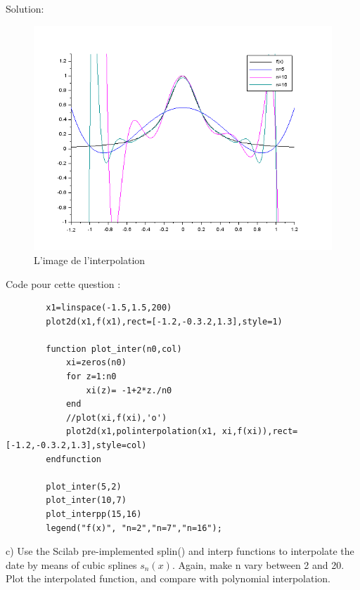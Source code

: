 \documentclass[11pt]{article}
\begin{document}
    Solution:
    \begin{figure}[H]
        \centering
        \includegraphics[scale=0.38]{inter}
        \caption{L'image de l'interpolation}
    \end{figure}
    Code pour cette question :
    \begin{verbatim}
        x1=linspace(-1.5,1.5,200)
        plot2d(x1,f(x1),rect=[-1.2,-0.3.2,1.3],style=1)

        function plot_inter(n0,col)
            xi=zeros(n0)
            for z=1:n0
                xi(z)= -1+2*z./n0
            end
            //plot(xi,f(xi),'o')
            plot2d(x1,polinterpolation(x1, xi,f(xi)),rect=[-1.2,-0.3.2,1.3],style=col)
        endfunction

        plot_inter(5,2)
        plot_inter(10,7)
        plot_interpp(15,16)
        legend("f(x)", "n=2","n=7","n=16");
    \end{verbatim}


    c) Use the Scilab pre-implemented splin() and interp functions to interpolate the date by means of cubic splines $s_n(x)$. Again, make n vary between 2 and 20. Plot the interpolated function, and compare with polynomial interpolation.\\
    
\end{document}
